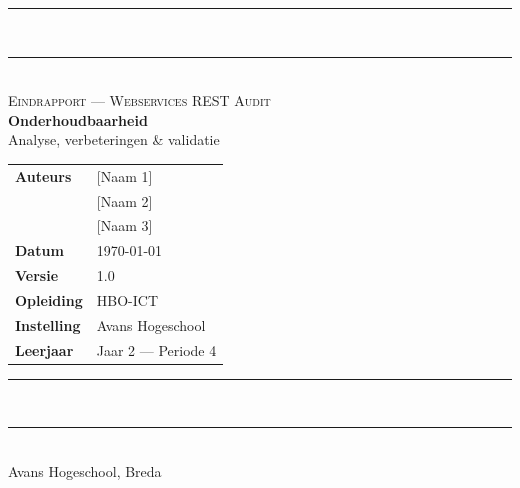 \documentclass[11pt, a4paper]{report}
\begin{document}
\begin{titlepage}
    \centering
    \vspace*{0.8cm}

    {\color{avansred}\rule{\linewidth}{3pt}}\\[0.4cm]
    {\color{avansred}\rule{\linewidth}{0.8pt}}\\[1.4cm]

    {\large\color{textgray}\textsc{Eindrapport --- Webservices REST Audit}}\\[0.8cm]

    {\fontsize{34}{40}\selectfont\bfseries\color{avansred} Onderhoudbaarheid}\\[0.4cm]
    {\Large\color{avansdark} Analyse, verbeteringen \& validatie}\\[1.8cm]

    \begin{tabular}{@{}ll@{}}
        \color{textgray}\textbf{Auteurs}      & [Naam 1]                  \\[2pt]
                                               & [Naam 2]                  \\[2pt]
                                               & [Naam 3]                  \\[10pt]
        \color{textgray}\textbf{Datum}         & \today                    \\[2pt]
        \color{textgray}\textbf{Versie}        & 1.0                       \\[2pt]
        \color{textgray}\textbf{Opleiding}     & HBO-ICT                   \\[2pt]
        \color{textgray}\textbf{Instelling}    & Avans Hogeschool          \\[2pt]
        \color{textgray}\textbf{Leerjaar}      & Jaar 2 --- Periode 4      \\
    \end{tabular}

    \vfill

    {\color{avansred}\rule{\linewidth}{0.8pt}}\\[0.3cm]
    {\color{avansred}\rule{\linewidth}{3pt}}\\[0.6cm]

    {\small\color{textgray}Avans Hogeschool, Breda}
\end{titlepage}
\end{document}

